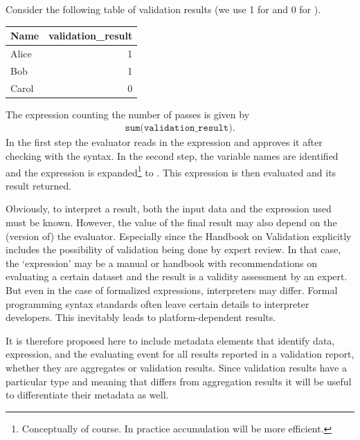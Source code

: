 \begin{example} Consider the following table of validation results (we use
1 for \waar{} and 0 for \onwaar{}).
\begin{center}
\begin{tabular}{lr}
Name  & validation\_result \\
\hline
Alice & 1    \\
Bob   & 1    \\
Carol & 0    \\
\end{tabular}
\end{center}
The expression counting the number of passes is given by
\begin{align*}
\texttt{sum(validation\_result)}.
\end{align*}
In the first step the evaluator reads in the expression and approves it after
checking with the syntax. In the second step, the variable names are identified
and the expression is expanded\footnote{Conceptually of course. In practice
accumulation will be more efficient.} to .  This expression is
then evaluated and its result returned.
\end{example}
Obviously, to  interpret a result, both the input data and the
expression used must be known. However, the value of the final result may also
depend on the (version of) the evaluator. Especially since the Handbook on
Validation explicitly includes the possibility of validation being done by
expert review. In that case, the `expression' may be a manual or handbook with
recommendations on evaluating a certain dataset and the result is a validity
assessment by an expert. But even in the case of formalized expressions,
interpreters may differ. Formal programming syntax standards often leave
certain details to interpreter developers. This inevitably leads to
platform-dependent results. 

It is therefore proposed here to include metadata elements that identify data,
expression, and the evaluating event for all results reported in a validation
report, whether they are aggregates or validation results. Since validation
results have a particular type and meaning that differs from aggregation
results it will be useful to differentiate their metadata as well.









